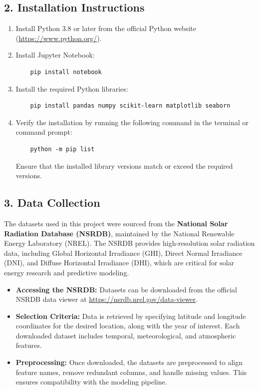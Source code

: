 \documentclass[10pt,twocolumn]{article}
\begin{document}
\begin{itemize}
\subsection*{2. Installation Instructions}
\begin{enumerate}
    \item Install Python 3.8 or later from the official Python website (\url{https://www.python.org/}).
    \item Install Jupyter Notebook:
    \begin{verbatim}
    pip install notebook
    \end{verbatim}
    \item Install the required Python libraries:
    \begin{verbatim}
    pip install pandas numpy scikit-learn matplotlib seaborn
    \end{verbatim}
    \item Verify the installation by running the following command in the terminal or command prompt:
    \begin{verbatim}
    python -m pip list
    \end{verbatim}
    Ensure that the installed library versions match or exceed the required versions.
\end{enumerate}

\subsection*{3. Data Collection}
The datasets used in this project were sourced from the \textbf{National Solar Radiation Database (NSRDB)}, maintained by the National Renewable Energy Laboratory (NREL). The NSRDB provides high-resolution solar radiation data, including Global Horizontal Irradiance (GHI), Direct Normal Irradiance (DNI), and Diffuse Horizontal Irradiance (DHI), which are critical for solar energy research and predictive modeling.

\begin{itemize}
    \item \textbf{Accessing the NSRDB:} Datasets can be downloaded from the official NSRDB data viewer at \url{https://nsrdb.nrel.gov/data-viewer}.
    \item \textbf{Selection Criteria:} Data is retrieved by specifying latitude and longitude coordinates for the desired location, along with the year of interest. Each downloaded dataset includes temporal, meteorological, and atmospheric features.
    \item \textbf{Preprocessing:} Once downloaded, the datasets are preprocessed to align feature names, remove redundant columns, and handle missing values. This ensures compatibility with the modeling pipeline.
\end{itemize}


\end{itemize}
\end{document}
